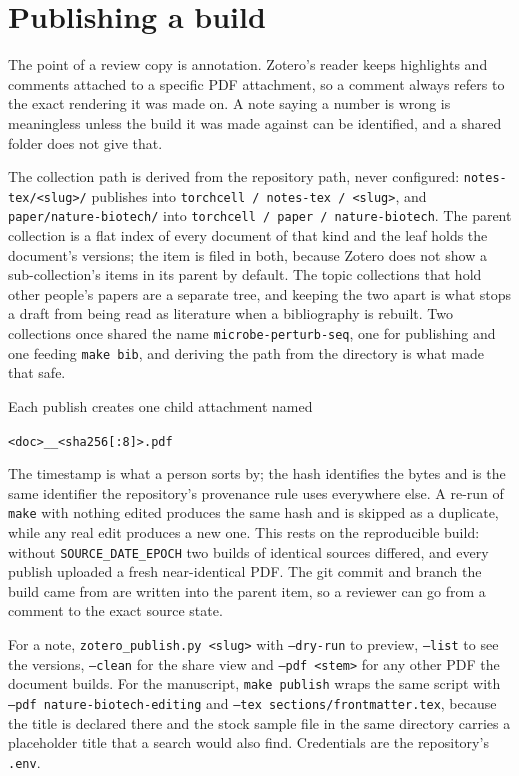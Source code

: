 
\section{Publishing a build}
\label{sec:publishing}

The point of a review copy is annotation. Zotero's reader keeps highlights and
comments attached to a specific PDF attachment, so a comment always refers to the
exact rendering it was made on. A note saying a number is wrong is meaningless
unless the build it was made against can be identified, and a shared folder does
not give that.

The collection path is derived from the repository path, never configured:
\texttt{notes-tex/<slug>/} publishes into \texttt{torchcell / notes-tex / <slug>},
and \texttt{paper/nature-biotech/} into \texttt{torchcell / paper / nature-biotech}.
The parent collection is a flat index of every document of that kind and the leaf
holds the document's versions; the item is filed in both, because Zotero does not
show a sub-collection's items in its parent by default. The topic collections that
hold other people's papers are a separate tree, and keeping the two apart is what
stops a draft from being read as literature when a bibliography is rebuilt. Two
collections once shared the name \texttt{microbe-perturb-seq}, one for publishing
and one feeding \texttt{make bib}, and deriving the path from the directory is what
made that safe.

Each publish creates one child attachment named
\begin{center}
\texttt{<doc>\_<YYYY-MM-DD-HH-MM-SS>\_<sha256[:8]>.pdf}
\end{center}
The timestamp is what a
person sorts by; the hash identifies the bytes and is the same identifier the
repository's provenance rule uses everywhere else. A re-run of \texttt{make} with
nothing edited produces the same hash and is skipped as a duplicate, while any
real edit produces a new one. This rests on the reproducible build: without
\texttt{SOURCE\_DATE\_EPOCH} two builds of identical sources differed, and every
publish uploaded a fresh near-identical PDF. The git commit and branch the build
came from are written into the parent item, so a reviewer can go from a comment to
the exact source state.

For a note, \texttt{zotero\_publish.py <slug>} with \texttt{--dry-run} to preview,
\texttt{--list} to see the versions, \texttt{--clean} for the share view and
\texttt{--pdf <stem>} for any other PDF the document builds. For the manuscript,
\texttt{make publish} wraps the same script with \texttt{--pdf nature-biotech-editing} and
\texttt{--tex sections/frontmatter.tex}, because the title is declared there and
the stock sample file in the same directory carries a placeholder title that a
search would also find. Credentials are the repository's \texttt{.env}.

